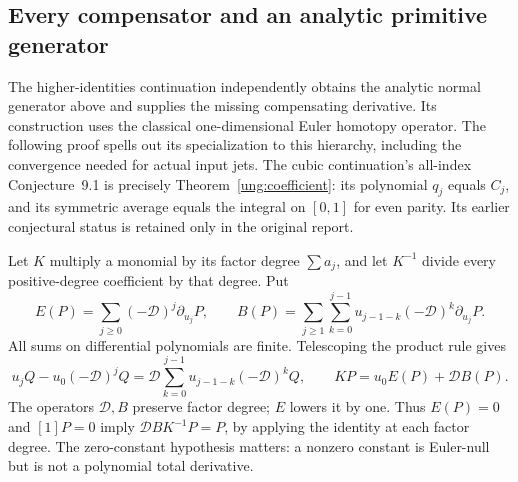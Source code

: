 \subsection{Every compensator and an analytic primitive generator}

The higher-identities continuation \cite{ngp:reports} independently obtains
the analytic normal generator above and supplies the missing compensating
derivative. Its construction uses the classical one-dimensional Euler
homotopy operator. The following proof spells out its specialization to
this hierarchy, including the convergence needed for actual input jets.
The cubic continuation's all-index Conjecture~9.1 is precisely
Theorem~\ref{ung:coefficient}: its polynomial $q_j$ equals $C_j$, and
its symmetric average equals the integral on $[0,1]$ for even parity.
Its earlier conjectural status is retained only in the original report.

Let $K$ multiply a monomial by its factor degree $\sum a_j$, and let
$K^{-1}$ divide every positive-degree coefficient by that degree. Put
\begin{equation}\label{ngp:operators}
 E(P)=\sum_{j\ge0}(-\mathcal D)^j\partial_{u_j}P,\qquad
 B(P)=\sum_{j\ge1}\sum_{k=0}^{j-1}
             u_{j-1-k}(-\mathcal D)^k\partial_{u_j}P.
\end{equation}
All sums on differential polynomials are finite. Telescoping the product
rule gives
\[
 u_jQ-u_0(-\mathcal D)^jQ
 =\mathcal D\sum_{k=0}^{j-1}u_{j-1-k}(-\mathcal D)^kQ,
 \qquad KP=u_0E(P)+\mathcal D B(P).
\]
The operators $\mathcal D,B$ preserve factor degree; $E$ lowers it by
one. Thus $E(P)=0$ and $[1]P=0$ imply
$\mathcal D BK^{-1}P=P$, by applying the identity at each factor degree.
The zero-constant hypothesis matters: a nonzero constant is Euler-null
but is not a polynomial total derivative.

